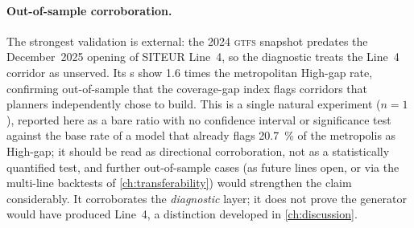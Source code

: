 \paragraph{Out-of-sample corroboration.} The strongest validation is external: the
2024 \textsc{gtfs} snapshot predates the December~2025 opening of SITEUR Line~4, so
the diagnostic treats the Line~4 corridor as unserved. Its \ageb{}s show
\num{1.6} times the metropolitan High-gap rate, confirming out-of-sample that the
coverage-gap index flags corridors that planners independently chose to build. This
is a single natural experiment ($n=1$), reported here as a bare ratio with no
confidence interval or significance test against the base rate of a model that
already flags \SI{20.7}{\percent} of the metropolis as High-gap; it should be read
as directional corroboration, not as a statistically quantified test, and further
out-of-sample cases (as future lines open, or via the multi-line backtests of
\cref{ch:transferability}) would strengthen the claim considerably. It corroborates
the \emph{diagnostic} layer; it does not prove the generator would have produced
Line~4, a distinction developed in \cref{ch:discussion}.
